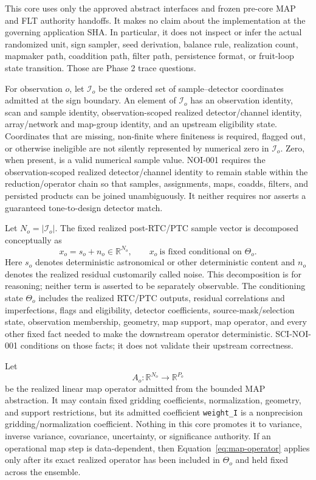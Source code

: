 \documentclass[11pt]{article}
\begin{document}
This core uses only the approved abstract interfaces and frozen pre-core MAP
and FLT authority handoffs.  It makes no claim about the implementation at the
governing application SHA.  In particular, it does not inspect or infer the
actual randomized unit, sign sampler, seed derivation, balance rule,
realization count, mapmaker path, coaddition path, filter path, persistence
format, or fruit-loop state transition.  Those are Phase 2 trace questions.

For observation $o$, let $\mathcal I_o$ be the ordered set of sample--detector
coordinates admitted at the sign boundary.  An element of $\mathcal I_o$ has
an observation identity, scan and sample identity, observation-scoped realized
detector/channel identity, array/network and map-group identity, and an
upstream eligibility state.  Coordinates that
are missing, non-finite where finiteness is required, flagged out, or otherwise
ineligible are not silently represented by numerical zero in $\mathcal I_o$.
Zero, when present, is a valid numerical sample value.  NOI-001 requires the
observation-scoped realized detector/channel identity to remain stable within
the reduction/operator chain so that samples, assignments, maps, coadds,
filters, and persisted products can be joined unambiguously.  It neither
requires nor asserts a guaranteed tone-to-design detector match.

Let $N_o=|\mathcal I_o|$.  The fixed realized post-RTC/PTC sample vector is
decomposed conceptually as
\begin{equation}
  x_o=s_o+n_o\in\mathbb R^{N_o},
  \qquad
  x_o\ \text{is fixed conditional on }\Theta_o .
  \label{eq:fixed-state}
\end{equation}
Here $s_o$ denotes deterministic astronomical or other deterministic content
and $n_o$ denotes the realized residual customarily called noise.  This
decomposition is for reasoning; neither term is asserted to be separately
observable.  The conditioning state $\Theta_o$ includes the realized RTC/PTC
outputs, residual correlations and imperfections, flags and eligibility,
detector coefficients, source-mask/selection state, observation membership,
geometry, map support, map operator, and every other fixed fact needed to make
the downstream operator deterministic.  SCI-NOI-001 conditions on those
facts; it does not validate their upstream correctness.

Let
\begin{equation}
  A_o:\mathbb R^{N_o}\longrightarrow\mathbb R^{P_o}
  \label{eq:map-operator}
\end{equation}
be the realized linear map operator admitted from the bounded MAP abstraction.
It may contain fixed gridding coefficients, normalization, geometry, and
support restrictions, but its admitted coefficient \texttt{weight\_I} is a
nonprecision gridding/normalization coefficient.  Nothing in this core
promotes it to variance, inverse variance, covariance, uncertainty, or
significance authority.  If an operational map step is data-dependent, then
Equation~\eqref{eq:map-operator} applies only after its exact realized operator
has been included in $\Theta_o$ and held fixed across the ensemble.
\end{document}
